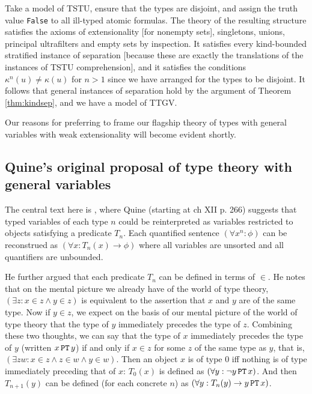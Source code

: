 \documentclass[12pt]{article}
\begin{document}
\Proof

Take a model of TSTU, ensure that the types are disjoint,
and assign the truth value {\tt False} to all ill-typed atomic formulas.  %
The theory of the resulting structure satisfies the axioms of extensionality [for nonempty sets], singletons, unions, principal ultrafilters and empty sets by inspection.  It satisfies every kind-bounded stratified instance of separation [because these are exactly the translations of the instances of TSTU comprehension], and it satisfies the conditions $\kappa^{n}(u) \neq \kappa(u)$ for $n>1$ since we have arranged for the types to be disjoint.  It follows that general instances of separation hold by the argument of Theorem \ref{thm:kindsep}, and we have a model of TTGV.

\endproof


Our reasons for preferring to frame our flagship theory of types with general variables with weak extensionality will become evident shortly.



\subsection{Quine's original proposal of type theory with general variables}


The central text here is \cite{ST&iL}, where Quine (starting at ch XII p. 266) suggests that typed variables of each type $n$ could be
reinterpreted as variables restricted to objects satisfying a
predicate $T_n$.  Each quantified sentence $(\forall x^n:\phi)$ can be
reconstrued as $(\forall x:T_n(x) \rightarrow \phi)$ where all
variables are unsorted and all quantifiers are unbounded.

He further argued that each predicate $T_n$ can be defined in terms of $\in$.  He notes that on the mental picture we already have of the world of type theory, $(\exists z:x \in z \wedge y \in z)$ is equivalent to the assertion that $x$ and $y$ are of the same type.  Now if $y\in z$, we expect on the basis of our mental picture of the world of type theory that the type of $y$ immediately precedes the type of $z$.  Combining these two thoughts, we can say
that the type of $x$ immediately precedes the type of $y$ (written $x \, {\tt PT} \, y$) if and only if $x \in z$ for some $z$ of the same type as $y$, that is, $(\exists zw:x \in z \wedge z \in w \wedge y \in w)$.   Then an object $x$ is of type 0 iff nothing is of type immediately preceding that of $x$:  $T_0(x)$ is defined as $(\forall y: \neg y \,{\tt PT}\, x)$.
And then $T_{n+1}(y)$ can be defined (for each concrete $n$) as $(\forall y:T_n(y) \rightarrow y \, {\tt PT} \, x)$.
\end{document}
